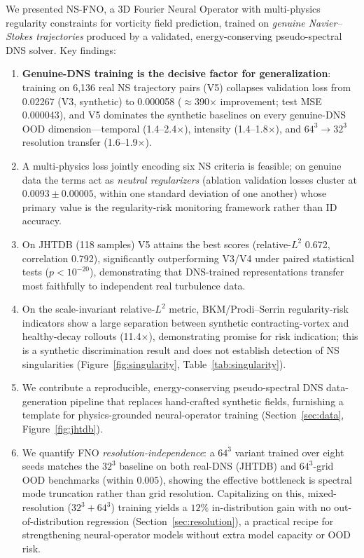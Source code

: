 \documentclass[review]{elsarticle}
\begin{document}
We presented NS-FNO, a 3D Fourier Neural Operator with multi-physics regularity constraints for vorticity field prediction, trained on \emph{genuine Navier--Stokes trajectories} produced by a validated, energy-conserving pseudo-spectral DNS solver. Key findings:
\begin{enumerate}
    \item \textbf{Genuine-DNS training is the decisive factor for generalization}: training on 6{,}136 real NS trajectory pairs (V5) collapses validation loss from 0.02267 (V3, synthetic) to 0.000058 ($\approx$390$\times$ improvement; test MSE 0.000043), and V5 dominates the synthetic baselines on every genuine-DNS OOD dimension---temporal (1.4--2.4$\times$), intensity (1.4--1.8$\times$), and $64^3\!\to\!32^3$ resolution transfer (1.6--1.9$\times$).
    \item A multi-physics loss jointly encoding six NS criteria is feasible; on genuine data the terms act as \emph{neutral regularizers} (ablation validation losses cluster at $0.0093\pm0.00005$, within one standard deviation of one another) whose primary value is the regularity-risk monitoring framework rather than ID accuracy.
    \item On JHTDB (118 samples) V5 attains the best scores (relative-$L^2$ 0.672, correlation 0.792), significantly outperforming V3/V4 under paired statistical tests ($p<10^{-20}$), demonstrating that DNS-trained representations transfer most faithfully to independent real turbulence data.
    \item On the scale-invariant relative-$L^2$ metric, BKM/Prodi--Serrin regularity-risk indicators show a large separation between synthetic contracting-vortex and healthy-decay rollouts (11.4$\times$), demonstrating promise for risk indication; this is a synthetic discrimination result and does not establish detection of NS singularities (Figure~\ref{fig:singularity}, Table~\ref{tab:singularity}).
    \item We contribute a reproducible, energy-conserving pseudo-spectral DNS data-generation pipeline that replaces hand-crafted synthetic fields, furnishing a template for physics-grounded neural-operator training (Section~\ref{sec:data}, Figure~\ref{fig:jhtdb}).
    \item We quantify FNO \emph{resolution-independence}: a $64^3$ variant trained over eight seeds matches the $32^3$ baseline on both real-DNS (JHTDB) and $64^3$-grid OOD benchmarks (within $0.005$), showing the effective bottleneck is spectral mode truncation rather than grid resolution. Capitalizing on this, mixed-resolution ($32^3{+}64^3$) training yields a $12\%$ in-distribution gain with no out-of-distribution regression (Section~\ref{sec:resolution}), a practical recipe for strengthening neural-operator models without extra model capacity or OOD risk.
\end{enumerate}
\end{document}
